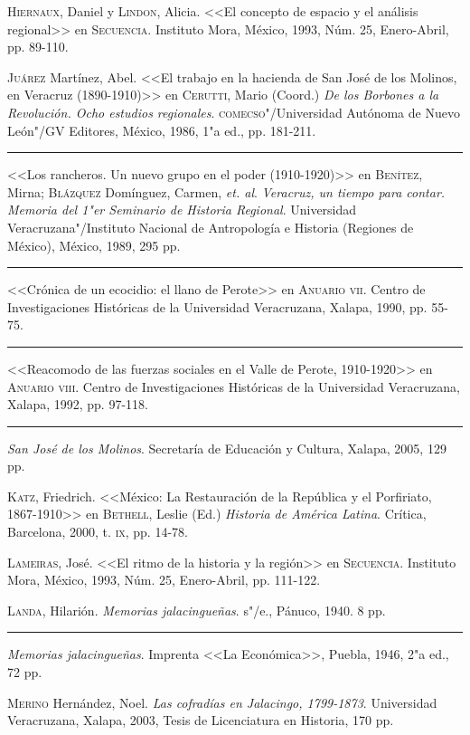 \documentclass[14pt,twoside,final]{extbook} %
\begin{document}
\textsc{Hiernaux}, Daniel y \textsc{Lindon}, Alicia. <<El concepto de espacio y el análisis regional>> en \textsc{Secuencia}. Instituto Mora, México, 1993, Núm. 25, Enero-Abril, pp. 89-110.

\textsc{Juárez} Martínez, Abel. <<El trabajo en la hacienda de San José de los Molinos, en Veracruz (1890-1910)>> en \textsc{Cerutti}, Mario (Coord.) \emph{De los Borbones a la
Revolución. Ocho estudios regionales}. \textsc{comecso}"/Universidad Autónoma de Nuevo León"/GV Editores, México, 1986, 1"a ed., pp. 181-211.

\rule{1cm}{0.4pt} <<Los rancheros. Un nuevo grupo en el poder (1910-1920)>> en \textsc{Benítez}, Mirna; \textsc{Blázquez} Domínguez, Carmen, \emph{et. al}. \emph{Veracruz, un tiempo para contar. Memoria del 1"er Seminario de Historia Regional}. Universidad Veracruzana"/Instituto Nacional de Antropología e Historia (Regiones de México), México, 1989, 295 pp.

\rule{1cm}{0.4pt} <<Crónica de un ecocidio: el llano de Perote>> en \textsc{Anuario vii}. Centro de Investigaciones Históricas de la Universidad Veracruzana, Xalapa, 1990, pp. 55-75.

\rule{1cm}{0.4pt} <<Reacomodo de las fuerzas sociales en el Valle de Perote, 1910-1920>> en \textsc{Anuario viii}. Centro de Investigaciones Históricas de la Universidad Veracruzana, Xalapa, 1992, pp. 97-118.

\rule{1cm}{0.4pt} \emph{San José de los Molinos}. Secretaría de Educación y Cultura, Xalapa, 2005, 129 pp.

\textsc{Katz}, Friedrich. <<México: La Restauración de la República y el Porfiriato, 1867-1910>> en \textsc{Bethell}, Leslie (Ed.) \emph{Historia de América Latina}. Crítica, Barcelona, 2000, t. \textsc{ix}, pp. 14-78.

\textsc{Lameiras}, José. <<El ritmo de la historia y la región>> en \textsc{Secuencia}. Instituto Mora, México, 1993, Núm. 25, Enero-Abril, pp. 111-122.

\textsc{Landa}, Hilarión. \emph{Memorias jalacingueñas}. s"/e., Pánuco, 1940. 8 pp.

\rule{1cm}{0.4pt} \emph{Memorias jalacingueñas}. Imprenta <<La Económica>>, Puebla, 1946, 2"a ed., 72 pp.

\textsc{Merino} Hernández, Noel. \emph{Las cofradías en Jalacingo, 1799-1873}. Universidad Veracruzana, Xalapa, 2003, Tesis de Licenciatura en Historia, 170 pp.
\end{document}
